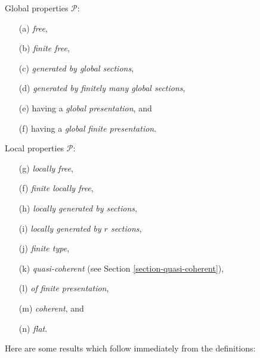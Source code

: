 \documentclass{stacks-project}
\theoremstyle{plain}
\theoremstyle{definition}
\theoremstyle{remark}
\numberwithin{equation}{subsection}
\begin{document}
\medskip\noindent
Global properties $\mathcal{P}$:
\begin{enumerate}
\item[(a)] {\it free},
\item[(b)] {\it finite free},
\item[(c)] {\it generated by global sections},
\item[(d)] {\it generated by finitely many global sections},
\item[(e)] having a {\it global presentation}, and
\item[(f)] having a {\it global finite presentation}.
\end{enumerate}
Local properties $\mathcal{P}$:
\begin{enumerate}
\item[(g)] {\it locally free},
\item[(f)] {\it finite locally free},
\item[(h)] {\it locally generated by sections},
\item[(i)] {\it locally generated by $r$ sections},
\item[(j)] {\it finite type},
\item[(k)] {\it quasi-coherent} (see Section \ref{section-quasi-coherent}),
\item[(l)] {\it of finite presentation},
\item[(m)] {\it coherent}, and
\item[(n)] {\it flat}.
\end{enumerate}
Here are some results which follow immediately from the definitions:
\end{document}
